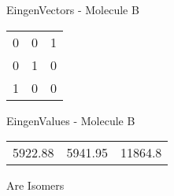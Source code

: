\begin{multicols}{2}
\begin{center}
\vtab
 EingenVectors - Molecule B     \\
\vtab
\begin{tabular}{|c c c|}
0	 & 	0	 & 	1	 \\
0	 & 	1	 & 	0	 \\
1	 & 	0	 & 	0
\end{tabular}

\vtab
 EingenValues - Molecule B     \\
\vtab
\begin{tabular}{|c c c|}
5922.88	 & 	5941.95	 & 	11864.8
\end{tabular}

\end{center}
\end{multicols}
\begin{center}
\vtab
\vtab
\textcolor{NavyBlue}{\Large Are Isomers}
\end{center}
\newpage

